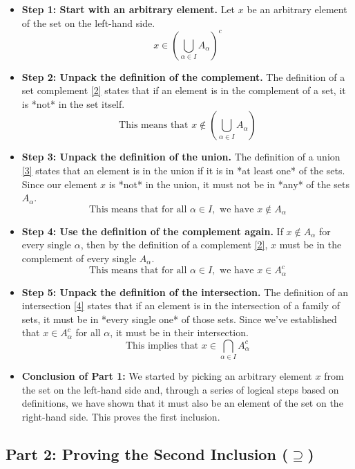 \documentclass[11pt,a4paper]{article}
\begin{document}
\begin{itemize}
    \item \textbf{Step 1: Start with an arbitrary element.}
    Let $x$ be an arbitrary element of the set on the left-hand side.
    $$ x \in \left( \bigcup_{\alpha \in I} A_\alpha \right)^c $$

    \item \textbf{Step 2: Unpack the definition of the complement.}
    The definition of a set complement \hyperlink{ref2}{[2]} states that if an element is in the complement of a set, it is *not* in the set itself.
    $$ \text{This means that } x \notin \left( \bigcup_{\alpha \in I} A_\alpha \right) $$

    \item \textbf{Step 3: Unpack the definition of the union.}
    The definition of a union \hyperlink{ref3}{[3]} states that an element is in the union if it is in *at least one* of the sets. Since our element $x$ is *not* in the union, it must not be in *any* of the sets $A_\alpha$.
    $$ \text{This means that for all } \alpha \in I, \text{ we have } x \notin A_\alpha $$

    \item \textbf{Step 4: Use the definition of the complement again.}
    If $x \notin A_\alpha$ for every single $\alpha$, then by the definition of a complement \hyperlink{ref2}{[2]}, $x$ must be in the complement of every single $A_\alpha$.
    $$ \text{This means that for all } \alpha \in I, \text{ we have } x \in A_\alpha^c $$

    \item \textbf{Step 5: Unpack the definition of the intersection.}
    The definition of an intersection \hyperlink{ref4}{[4]} states that if an element is in the intersection of a family of sets, it must be in *every single one* of those sets. Since we've established that $x \in A_\alpha^c$ for all $\alpha$, it must be in their intersection.
    $$ \text{This implies that } x \in \bigcap_{\alpha \in I} A_\alpha^c $$

    \item \textbf{Conclusion of Part 1:} We started by picking an arbitrary element $x$ from the set on the left-hand side and, through a series of logical steps based on definitions, we have shown that it must also be an element of the set on the right-hand side. This proves the first inclusion.
\end{itemize}

\subsection{Part 2: Proving the Second Inclusion ($\supseteq$)}
\end{document}
